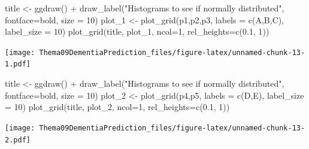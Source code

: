 \documentclass[
]{article}
\newenvironment{Shaded}{\begin{snugshade}}{\end{snugshade}}
\newcommand{\AttributeTok}[1]{\textcolor[rgb]{0.77,0.63,0.00}{#1}}
\newcommand{\DecValTok}[1]{\textcolor[rgb]{0.00,0.00,0.81}{#1}}
\newcommand{\FloatTok}[1]{\textcolor[rgb]{0.00,0.00,0.81}{#1}}
\newcommand{\FunctionTok}[1]{\textcolor[rgb]{0.00,0.00,0.00}{#1}}
\newcommand{\NormalTok}[1]{#1}
\newcommand{\OtherTok}[1]{\textcolor[rgb]{0.56,0.35,0.01}{#1}}
\newcommand{\SpecialCharTok}[1]{\textcolor[rgb]{0.00,0.00,0.00}{#1}}
\newcommand{\StringTok}[1]{\textcolor[rgb]{0.31,0.60,0.02}{#1}}
\begin{document}
\begin{Shaded}
\begin{Highlighting}[]
\NormalTok{title }\OtherTok{\textless{}{-}} \FunctionTok{ggdraw}\NormalTok{() }\SpecialCharTok{+} \FunctionTok{draw\_label}\NormalTok{(}\StringTok{"Histograms to see if normally distributed"}\NormalTok{, }\AttributeTok{fontface=}\StringTok{\textquotesingle{}bold\textquotesingle{}}\NormalTok{, }\AttributeTok{size =} \DecValTok{10}\NormalTok{)}
\NormalTok{plot\_1 }\OtherTok{\textless{}{-}} \FunctionTok{plot\_grid}\NormalTok{(p1,p2,p3, }\AttributeTok{labels =} \FunctionTok{c}\NormalTok{(}\StringTok{\textquotesingle{}A\textquotesingle{}}\NormalTok{,}\StringTok{\textquotesingle{}B\textquotesingle{}}\NormalTok{,}\StringTok{\textquotesingle{}C\textquotesingle{}}\NormalTok{), }\AttributeTok{label\_size =} \DecValTok{10}\NormalTok{)}
\FunctionTok{plot\_grid}\NormalTok{(title, plot\_1, }\AttributeTok{ncol=}\DecValTok{1}\NormalTok{, }\AttributeTok{rel\_heights=}\FunctionTok{c}\NormalTok{(}\FloatTok{0.1}\NormalTok{, }\DecValTok{1}\NormalTok{))}
\end{Highlighting}
\end{Shaded}

\texttt{[image: Thema09DementiaPrediction\_files/figure-latex/unnamed-chunk-13-1.pdf]}

\begin{Shaded}
\begin{Highlighting}[]
\NormalTok{title }\OtherTok{\textless{}{-}} \FunctionTok{ggdraw}\NormalTok{() }\SpecialCharTok{+} \FunctionTok{draw\_label}\NormalTok{(}\StringTok{"Histograms to see if normally distributed"}\NormalTok{, }\AttributeTok{fontface=}\StringTok{\textquotesingle{}bold\textquotesingle{}}\NormalTok{, }\AttributeTok{size =} \DecValTok{10}\NormalTok{)}
\NormalTok{plot\_2 }\OtherTok{\textless{}{-}} \FunctionTok{plot\_grid}\NormalTok{(p4,p5, }\AttributeTok{labels =} \FunctionTok{c}\NormalTok{(}\StringTok{\textquotesingle{}D\textquotesingle{}}\NormalTok{,}\StringTok{\textquotesingle{}E\textquotesingle{}}\NormalTok{), }\AttributeTok{label\_size =} \DecValTok{10}\NormalTok{)}
\FunctionTok{plot\_grid}\NormalTok{(title, plot\_2, }\AttributeTok{ncol=}\DecValTok{1}\NormalTok{, }\AttributeTok{rel\_heights=}\FunctionTok{c}\NormalTok{(}\FloatTok{0.1}\NormalTok{, }\DecValTok{1}\NormalTok{))}
\end{Highlighting}
\end{Shaded}

\texttt{[image: Thema09DementiaPrediction\_files/figure-latex/unnamed-chunk-13-2.pdf]}
\end{document}
